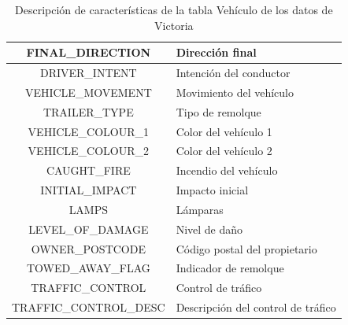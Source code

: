 \begin{table}[H]
\begin{center}
\begin{tabular}{|c|l|}
			FINAL\_DIRECTION & Dirección final \\ \hline
			DRIVER\_INTENT & Intención del conductor \\ \hline
			VEHICLE\_MOVEMENT & Movimiento del vehículo \\ \hline
			TRAILER\_TYPE & Tipo de remolque \\ \hline
			VEHICLE\_COLOUR\_1 & Color del vehículo 1 \\ \hline
			VEHICLE\_COLOUR\_2 & Color del vehículo 2 \\ \hline
			CAUGHT\_FIRE & Incendio del vehículo \\ \hline
			INITIAL\_IMPACT & Impacto inicial \\ \hline
			LAMPS & Lámparas \\ \hline
			LEVEL\_OF\_DAMAGE & Nivel de daño \\ \hline
			OWNER\_POSTCODE & Código postal del propietario \\ \hline
			TOWED\_AWAY\_FLAG & Indicador de remolque \\ \hline
			TRAFFIC\_CONTROL & Control de tráfico \\ \hline
			TRAFFIC\_CONTROL\_DESC & Descripción del control de tráfico \\ \hline
		\end{tabular}
	\end{center}
	\caption{Descripción de características de la tabla Vehículo de los datos de Victoria}
	\label{Victoria_VEHICLE_TABLE}
\end{table} 


